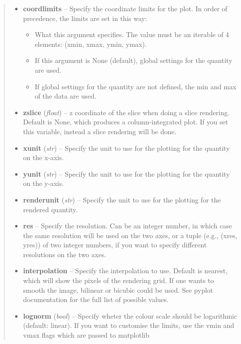 \documentclass[letterpaper,10pt,english]{sphinxmanual}
\begin{document}
\begin{fulllineitems}
\begin{quote}
\begin{description}
\begin{itemize}
\item {} 
\textbf{coordlimits} --
Specify the coordinate limits for the plot. In order of
precedence, the limits are set in this way:
\begin{itemize}
\item {} 
What this argument specifies. The value must be an
iterable of 4 elements: (xmin, xmax, ymin, ymax).

\item {} 
If this argument is None (default), global settings for
the quantity are used.

\item {} 
If global settings for the quantity are not defined,
the min and max of the data are used.

\end{itemize}

\item {} 
\textbf{zslice} (\emph{float}) --
z coordinate of the slice when doing a slice rendering.
Default is None, which produces a column-integrated plot.
If you set this variable, instead a slice rendering will
be done.

\item {} 
\textbf{xunit} (\emph{str}) --
Specify the unit to use for the plotting for the quantity
on the x-axis.

\item {} 
\textbf{yunit} (\emph{str}) --
Specify the unit to use for the plotting for the quantity
on the y-axis.

\item {} 
\textbf{renderunit} (\emph{str}) --
Specify the unit to use for the plotting for the rendered
quantity.

\item {} 
\textbf{res} --
Specify the resolution. Can be an integer number, in which
case the same resolution will be used on the two axes, or a
tuple (e.g., (xres, yres)) of two integer numbers, if you
want to specify different resolutions on the two axes.

\item {} 
\textbf{interpolation} --
Specify the interpolation to use. Default is nearest,
which will show the pixels of the rendering grid. If one
wants to smooth the image, bilinear or bicubic could be
used. See pyplot documentation for the full list of
possible values.

\item {} 
\textbf{lognorm} (\emph{bool}) --
Specify wheter the colour scale should be
logarithmic (default: linear). If you want to customise the
limits, use the vmin and vmax flags which are passed to
matplotlib


\end{itemize}
\end{description}
\end{quote}
\end{fulllineitems}
\end{document}
